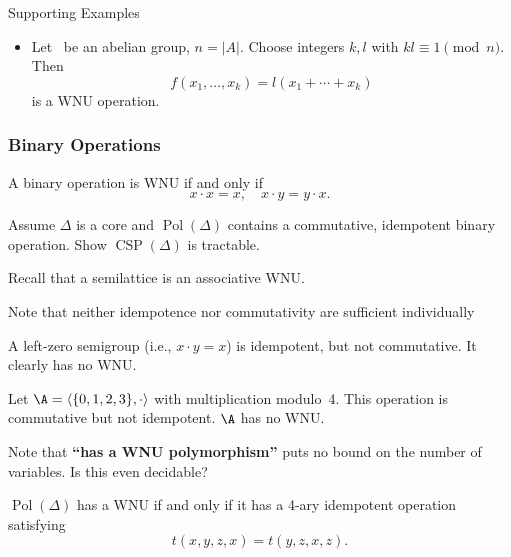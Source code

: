 \documentclass[12pt,xcolor=dvipsnames,handout
   ]{beamer}
\newcommand{\bigpause}{\pause\bigskip}
\DeclareMathOperator{\CSP}{CSP}
\DeclareMathOperator{\Pol}{Pol}
\renewcommand{\.}{\cdot}
\let\origtextbf=\textbf
\renewcommand{\textbf}[1]{{\usebeamercolor[fg]{example text}%
     \origtextbf{#1}}}
\begin{document}
\begin{frame}
\begin{overprint}
\begin{exampleblock}{Supporting Examples}
\begin{itemize}
      \item<6-> Let \A\ be an abelian group, $n=|A|$. Choose
        integers $k, l$ with $kl \equiv 1 \pmod n$. Then
        \begin{equation*}
          f(x_1,\dots,x_k) = l(x_1+\cdots + x_k)
        \end{equation*}
        is a WNU operation.
      \end{itemize}
    \end{exampleblock}
  \end{overprint}
\end{frame}

\begin{frame}
  \frametitle{Binary Operations}
  A binary operation is  WNU if and only if
  \begin{equation*}
    x\.x = x,\quad x\.y = y\.x.
  \end{equation*}

\pause
  \begin{problem}
    Assume $\Delta$ is a core and $\Pol(\Delta)$
    contains a commutative, idempotent binary operation. Show
    $\CSP(\Delta)$ is tractable.
  \end{problem}

  Recall that a semilattice is an associative WNU.

  \pause
  Note that neither idempotence nor commutativity are sufficient
  individually  
\end{frame}

\begin{frame}
  A left-zero semigroup (i.e., $x\.y=x$) is idempotent, but not
  commutative. It clearly has no WNU.

  \bigpause
  Let $\A=\<\{0,1,2,3\}, \cdot\>$ with multiplication modulo~4. This
  operation is commutative but not idempotent. $\A$ has no WNU.
\end{frame}


\begin{frame}
  Note that \textbf{``has a WNU polymorphism''} puts no bound on the
  number of variables. Is this even decidable?

  \pause
  \begin{theorem} 
    $\Pol(\Delta)$ has a WNU  if and only if it has a 4-ary idempotent
    operation satisfying
    \begin{equation*}
      t(x,y,z,x) = t(y,z,x,z).
    \end{equation*}
  \end{theorem}

\end{frame}

 

\end{document}
